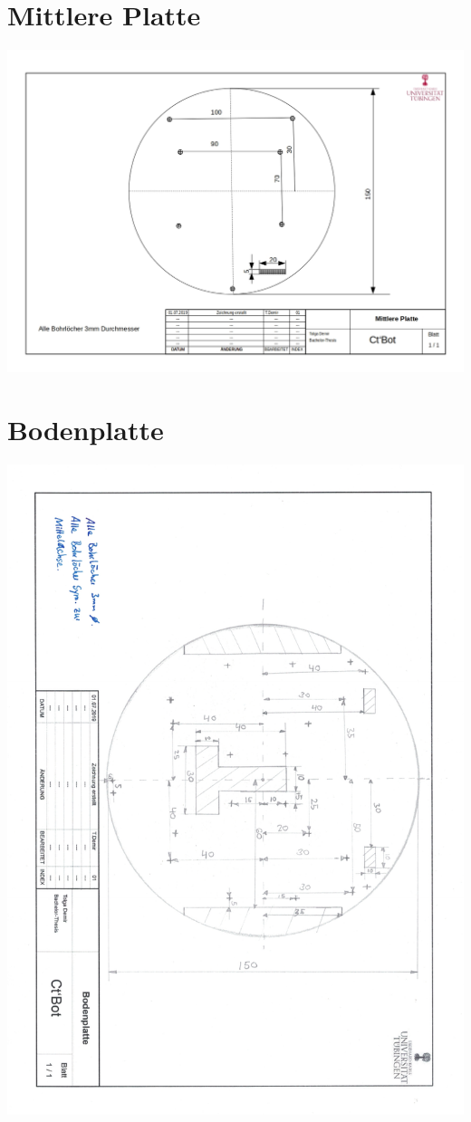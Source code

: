 \documentclass[twoside,12pt,a4paper]{report}
\begin{document}
	\section{Mittlere Platte}
	\includegraphics[angle=90,origin=c, scale= 0.7]{images/Zeichnung_mittlere_Platte.jpg}
	\section{Bodenplatte}
	\includegraphics[angle=180,origin=c, scale= 0.7]{images/Bodenplatte.pdf}
\end{document}
